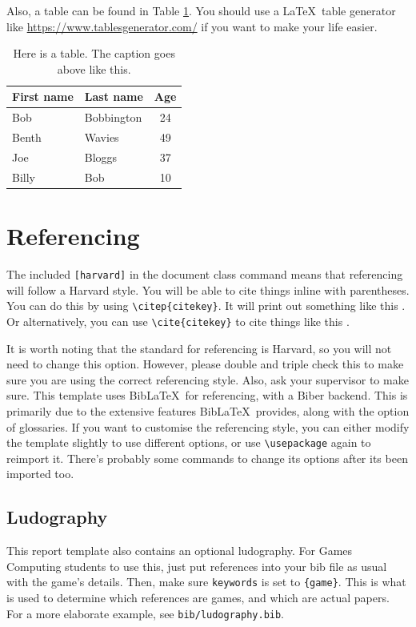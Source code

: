 Also, a table can be found in Table \ref{tbl:example-table}. You should use a \LaTeX~table generator like \url{https://www.tablesgenerator.com/} if you want to make your life easier.

\begin{table}[h]
    \caption{Here is a table. The caption goes above like this.}
    \centering
    \begin{tabular}{l|l|c}
        First name & Last name & Age \\
        \hline\hline
        Bob & Bobbington & 24 \\
        Benth & Wavies & 49 \\
        Joe & Bloggs & 37 \\
        Billy & Bob & 10 \\

    \end{tabular}
    \label{tbl:example-table}
\end{table}

\section{Referencing}
The included \texttt{[harvard]} in the document class command means that referencing will follow a Harvard style. You will be able to cite things inline with parentheses. You can do this by using \texttt{\textbackslash citep\{citekey\}}. It will print out something like this \citep{aad2012observation}. Or alternatively, you can use \texttt{\textbackslash cite\{citekey\}} to cite things like this \cite{chatrchyan2012observation}.

It is worth noting that the standard for referencing is Harvard, so you will not need to change this option. However, please double and triple check this to make sure you are using the correct referencing style. Also, ask your supervisor to make sure. This template uses Bib\LaTeX~for referencing, with a Biber backend. This is primarily due to the extensive features Bib\LaTeX~provides, along with the option of glossaries. If you want to customise the referencing style, you can either modify the template slightly to use different options, or use \texttt{\textbackslash usepackage} again to reimport it. There's probably some commands to change its options after its been imported too.

\subsection{Ludography}
This report template also contains an optional ludography. For Games Computing students to use this, just put references into your bib file as usual with the game's details. Then, make sure \texttt{keywords} is set to \texttt{\{game\}}. This is what is used to determine which references are games, and which are actual papers. For a more elaborate example, see \texttt{bib/ludography.bib}.

